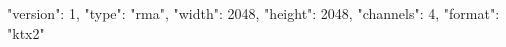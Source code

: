 {
  "version": 1,
  "type": "rma",
  "width": 2048,
  "height": 2048,
  "channels": 4,
  "format": "ktx2"
}
